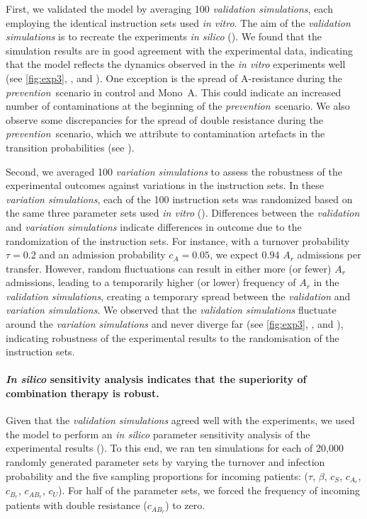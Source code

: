 First, we validated the model by averaging 100 \textit{validation simulations}, each employing the identical instruction sets used \textit{in vitro}.
The aim of the \textit{validation simulations} is to recreate the experiments \textit{in silico} ().
We found that the simulation results are in good agreement with the experimental data, indicating that the model reflects the dynamics observed in the \textit{in vitro} experiments well (see \autoref{fig:exp3}, , and ).
One exception is the spread of A-resistance during the \textit{prevention}~scenario in control and Mono~A.
This could indicate an increased number of contaminations at the beginning of the \textit{prevention}~scenario.
We also observe some discrepancies for the spread of double resistance during the \textit{prevention}~scenario, which we attribute to contamination artefacts in the transition probabilities (see ).

Second, we averaged 100 \textit{variation simulations} to assess the robustness of the experimental outcomes against variations in the instruction sets. 
In these \textit{variation simulations}, each of the 100 instruction sets was randomized based on the same three parameter sets used \textit{in vitro} (). 
Differences between the \textit{validation} and \textit{variation simulations} indicate differences in outcome due to the randomization of the instruction sets.
For instance, with a turnover probability $\tau = 0.2$ and an admission probability $c_A = 0.05$, we expect $0.94$ $A_r$ admissions per transfer. However, random fluctuations can result in either more (or fewer) $A_r$ admissions, leading to a temporarily higher (or lower) frequency of $A_r$ in the \textit{validation simulations}, creating a temporary spread between the \textit{validation} and \textit{variation simulations}.
We observed that the \textit{validation simulations} fluctuate around the \textit{variation simulations} and never diverge far (see \autoref{fig:exp3}, , and ), indicating robustness of the experimental results to the randomisation of the instruction sets.


\paragraph{\textit{In silico} sensitivity analysis indicates that the superiority of combination therapy is robust.}
Given that the \textit{validation simulations} agreed well with the experiments, we used the model to perform an \textit{in silico} parameter sensitivity analysis of the experimental results (). 
To this end, we ran ten simulations for each of 20,000 randomly generated parameter sets by varying the turnover and infection probability and the five sampling proportions for incoming patients: ($\tau$, $\beta$, $c_S$, $c_{A_r}$, $c_{B_r}$, $c_{AB_r}$, $c_U$).
For half of the parameter sets, we forced the frequency of incoming patients with double resistance ($c_{AB_r}$) to zero. 

